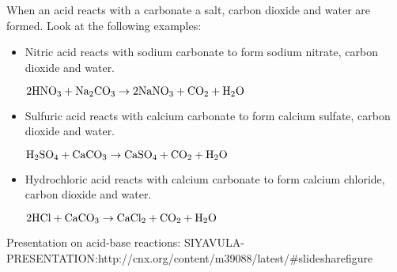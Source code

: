 When an acid reacts with a carbonate a salt, carbon dioxide and water are formed. Look at the following examples:\\

\begin{itemize}
\item{Nitric acid reacts with sodium carbonate to form sodium nitrate, carbon dioxide and water.
\begin{center}
$\rm{2HNO_{3} + Na_{2}CO_{3} \rightarrow 2NaNO_{3} + CO_{2} + H_{2}O}$\\
\end{center}
}
\item{Sulfuric acid reacts with calcium carbonate to form calcium sulfate, carbon dioxide and water.
\begin{center}
$\rm{H_{2}SO_{4} + CaCO_{3} \rightarrow CaSO_{4} + CO_{2} + H_{2}O}$\\
\end{center}
}
\item{Hydrochloric acid reacts with calcium carbonate to form calcium chloride, carbon dioxide and water.
\begin{center}
$\rm{2HCl + CaCO_{3} \rightarrow CaCl_{2} + CO_{2} + H_{2}O}$ 
\end{center}
}
\end{itemize}
Presentation on acid-base reactions: SIYAVULA-PRESENTATION:http://cnx.org/content/m39088/latest/#slidesharefigure
